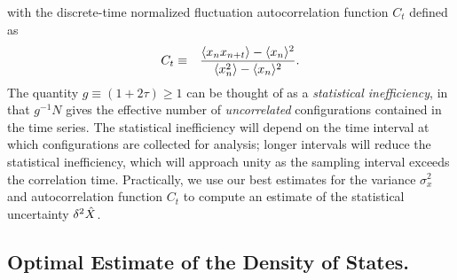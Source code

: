 with the discrete-time normalized fluctuation autocorrelation function $C_t$ defined as
\begin{eqnarray}
C_t &\equiv& \frac{\langle x_n x_{n+t} \rangle - \langle x_n \rangle^2}{\langle x_n^2 \rangle - \langle x_n \rangle^2} . \label{wham:equation:autocorrelation-definition}
\end{eqnarray}
The quantity $g \equiv (1 + 2 \tau) \ge 1$ can be thought of as a \emph{statistical inefficiency}, in that $g^{-1} N$ gives the effective number of \emph{uncorrelated} configurations contained in the time series.  The statistical inefficiency will depend on the time interval at which configurations are collected for analysis; longer intervals will reduce the statistical inefficiency, which will approach unity as the sampling interval exceeds the correlation time. Practically, we use our best estimates for the variance $\sigma_x^2$ and autocorrelation function $C_t$ to compute an estimate of the statistical uncertainty $\delta^2 \hat{X}$.

\subsection{Optimal Estimate of the Density of States.}
\label{wham:section:canonical-optimal-estimate}

